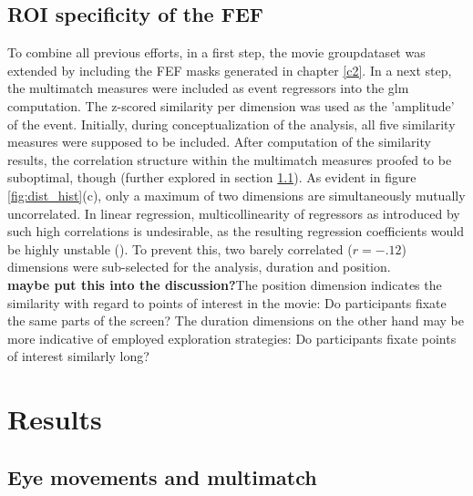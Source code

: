 \documentclass[a4paper, 12pt]{scrreprt}
\begin{document}
\subsection{ROI specificity of the FEF}\label{c3:FEF}

To combine all previous efforts, in a first step, the movie groupdataset was extended by including the FEF masks generated in chapter \ref{c2}. In a next step, the multimatch measures were included as event regressors into the glm computation. The z-scored similarity per dimension was used as the 'amplitude' of the event. Initially, during conceptualization of the analysis, all five similarity measures were supposed to be included. After computation of the similarity results, the correlation structure within the multimatch measures proofed to be suboptimal, though (further explored in section \ref{sec:res_mm}). As evident in figure \ref{fig:dist_hist}(c), only a maximum of two dimensions are simultaneously mutually uncorrelated. In linear regression, multicollinearity of regressors as introduced by such high correlations is undesirable, as the resulting regression coefficients would be highly unstable (\cite{wickens2014geometry}). To prevent this, two barely correlated ($r = -.12$) dimensions were sub-selected for the analysis, duration and position. \\
\textbf{maybe put this into the discussion?}The position dimension indicates the similarity with regard to points of interest in the movie: Do participants fixate the same parts of the screen? The duration dimensions on the other hand may be more indicative of employed exploration strategies: Do participants fixate points of interest similarly long?


\section{Results}

\subsection{Eye movements and multimatch}\label{sec:res_mm}
\end{document}
